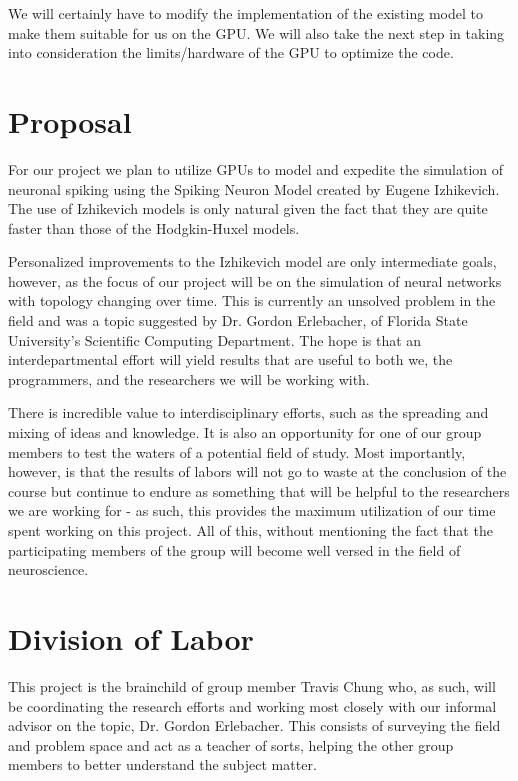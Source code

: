 \documentclass[a4paper]{article}
\begin{document}
We will certainly have to modify the implementation of the existing model to make them suitable for us on the GPU.  We will also take the next step in taking into consideration the limits/hardware of the GPU to optimize the code.

\section{Proposal}

For our project we plan to utilize GPUs to model and expedite the simulation of neuronal spiking using the Spiking Neuron Model created by Eugene Izhikevich. The use of Izhikevich models is only natural given the fact that they are quite faster than those of the Hodgkin-Huxel models.

Personalized improvements to the Izhikevich model are only intermediate goals, however, as the focus of our project will be on the simulation of neural networks with topology changing over time. This is currently an unsolved problem in the field and was a topic suggested by Dr. Gordon Erlebacher, of Florida State University's Scientific Computing Department. The hope is that an interdepartmental effort will yield results that are useful to both we, the programmers, and the researchers we will be working with.

There is incredible value to interdisciplinary efforts, such as the spreading and mixing of ideas and knowledge. It is also an opportunity for one of our group members to test the waters of a potential field of study. Most importantly, however, is that the results of labors will not go to waste at the conclusion of the course but continue to endure as something that will be helpful to the researchers we are working for - as such, this provides the maximum utilization of our time spent working on this project. All of this, without mentioning the fact that the participating members of the group will become well versed in the field of neuroscience.

\section{Division of Labor}

This project is the brainchild of group member Travis Chung who, as such, will be coordinating the research efforts and working most closely with our informal advisor on the topic, Dr. Gordon Erlebacher. This consists of surveying the field and problem space and act as a teacher of sorts, helping the other group members to better understand the subject matter.
\end{document}
